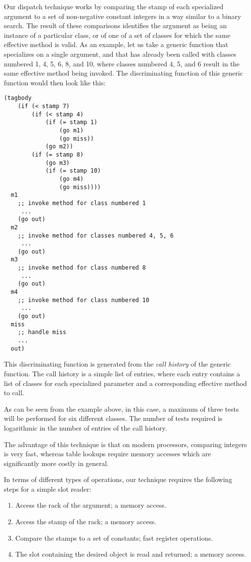 Our dispatch technique works by comparing the stamp of each
specialized argument to a set of non-negative constant integers in a
way similar to a binary search.  The result of these comparisons
identifies the argument as being an instance of a particular class, or
of one of a set of classes for which the same effective method is
valid.  As an example, let us take a generic function that specializes
on a single argument, and that has already been called with classes
numbered 1, 4, 5, 6, 8, and 10, where classes numbered 4, 5, and 6
result in the same effective method being invoked.  The discriminating
function of this generic function would then look like this:

\begin{verbatim}
(tagbody 
    (if (< stamp 7)
        (if (< stamp 4)
            (if (= stamp 1)
                (go m1)
                (go miss))
            (go m2))
        (if (= stamp 8)
            (go m3)
            (if (= stamp 10)
                (go m4)
                (go miss))))
  m1
    ;; invoke method for class numbered 1
     ...
    (go out)
  m2
    ;; invoke method for classes numbered 4, 5, 6
     ...
    (go out)
  m3
    ;; invoke method for class numbered 8
     ...
    (go out)   
  m4
    ;; invoke method for class numbered 10
     ...
    (go out)   
  miss
    ;; handle miss
    ...
  out)
\end{verbatim}

This discriminating function is generated from the \emph{call history}
of the generic function.  The call history is a simple list of
entries, where each entry contains a list of classes for each
specialized parameter and a corresponding effective method to call. 

As can be seen from the example above, in this case, a maximum of
three tests will be performed for six different classes.  The number
of tests required is logarithmic in the number of entries of the call
history.

The advantage of this technique is that on modern processors,
comparing integers is very fast, whereas table lookups require memory
accesses which are significantly more costly in general.

In terms of different types of operations, our technique
requires the following steps for a simple slot reader:

\begin{enumerate}
\item Access the rack of the argument; a memory access.
\item Access the stamp of the rack; a memory access.
\item Compare the stamps to a set of constants; fast register
  operations.
\item The slot containing the desired object is read and returned; a
  memory access.
\end{enumerate}

